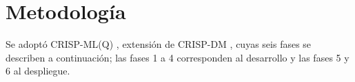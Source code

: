 ﻿\section{Metodologí­a}\label{sec:metodo}
Se adoptó CRISP-ML(Q) \cite{studer2021crispml}, extensión de CRISP-DM \cite{wirth2000crispdm}, cuyas seis fases se describen a continuación; las fases 1 a 4 corresponden al desarrollo y las fases 5 y 6 al despliegue.







